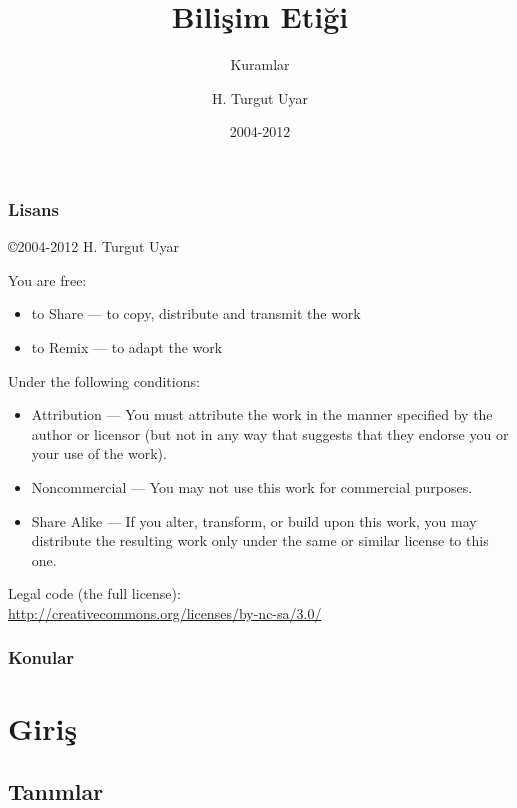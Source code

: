 \documentclass[dvipsnames]{beamer}
\title{Bilişim Etiği}
\subtitle{Kuramlar}
\author{H. Turgut Uyar}
\date{2004-2012}
\theoremstyle{definition}
\theoremstyle{example}
\theoremstyle{plain}
\begin{document}
\begin{frame}
  \titlepage
\end{frame}

\begin{frame}
  \frametitle{Lisans}

  \hfill
  \copyright 2004-2012 H. Turgut Uyar

  \vfill
  \begin{tiny}
    You are free:
    \begin{itemize}
      \item to Share — to copy, distribute and transmit the work
      \item to Remix — to adapt the work
    \end{itemize}

    Under the following conditions:
    \begin{itemize}
      \item Attribution — You must attribute the work in the manner specified by
        the author or licensor (but not in any way that suggests that they
        endorse you or your use of the work).

      \item Noncommercial — You may not use this work for commercial purposes.

      \item Share Alike — If you alter, transform, or build upon this work, you
        may distribute the resulting work only under the same or similar license
        to this one.
    \end{itemize}
  \end{tiny}

  \vfill
  Legal code (the full license):\\
  \url{http://creativecommons.org/licenses/by-nc-sa/3.0/}
\end{frame}

\begin{frame}
  \frametitle{Konular}
  \tableofcontents
\end{frame}

\section{Giriş}

\subsection{Tanımlar}
\end{document}
